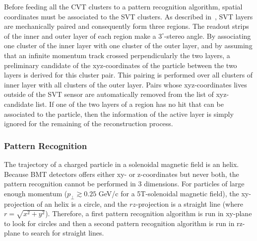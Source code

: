 Before feeding all the CVT clusters to a pattern recognition algorithm, spatial coordinates must be associated to the
SVT clusters. As described in~\cite{svt-nim}, SVT layers are mechanically paired and consequently form three regions.
The readout strips of the inner and outer layer of each region make a $3^\circ$-stereo angle. By associating one
cluster of the inner layer with one cluster of the outer layer, and by assuming that an infinite momentum track crossed
perpendicularly the two layers, a preliminary candidate of the xyz-coordinates of the particle between the two layers
is derived for this cluster pair. This pairing is performed over all clusters of inner layer with all clusters of the
outer layer. Pairs whose xyz-coordinates lives outside of the SVT sensor are automatically removed from the list of
xyz-candidate list. If one of the two layers of a region has no hit that can be associated to the particle, then the information of the active layer is simply ignored for the remaining of the reconstruction process.

\subsubsection{Pattern Recognition}
The trajectory of a charged particle in a solenoidal magnetic field is an helix. Because BMT detectors offers either
xy- or z-coordinates but never both, the pattern recognition cannot be performed in 3 dimensions. For particles of
large enough momentum ($p_\perp \gtrsim 0.25$ GeV/c for a 5T-solenoidal magnetic field), the xy-projection of an
helix is a circle, and the $rz$-projection is a straight line (where $r = \sqrt{x^2 + y^2}$). Therefore, a first
pattern recognition algorithm is run in xy-plane to look for circles and then a second pattern recognition algorithm is
run in rz-plane to search for straight lines.

